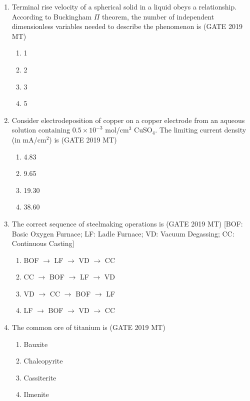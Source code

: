 \documentclass[12pt]{article}
\begin{document}
\begin{enumerate}
\item Terminal rise velocity of a spherical solid in a liquid obeys a relationship. According to Buckingham $\Pi$ theorem, the number of independent dimensionless variables needed to describe the phenomenon is \hspace{1em} (GATE 2019 MT)
\begin{enumerate}[label=(\alph*)]
    \item 1
    \item 2  
    \item 3   
    \item 5   
\end{enumerate}

\item Consider electrodeposition of copper on a copper electrode from an aqueous solution containing $0.5 \times 10^{-3}$ mol/cm$^3$ CuSO$_4$. The limiting current density (in mA/cm$^2$) is \hspace{1em} (GATE 2019 MT)
\begin{enumerate}[label=(\alph*)]
    \item 4.83
    \item 9.65  
    \item 19.30 
    \item 38.60
\end{enumerate}

\item The correct sequence of steelmaking operations is \hspace{1em} (GATE 2019 MT)  
[BOF: Basic Oxygen Furnace; LF: Ladle Furnace;  VD: Vacuum Degassing; CC: Continuous Casting]
\begin{enumerate}[label=(\alph*)]
    \item BOF $\to$ LF $\to$ VD $\to$ CC
    \item CC $\to$ BOF $\to$ LF $\to$ VD
    \item VD $\to$ CC $\to$ BOF $\to$ LF
    \item LF $\to$ BOF $\to$ VD $\to$ CC
\end{enumerate}

\item The common ore of titanium is \hspace{1em} (GATE 2019 MT)
\begin{enumerate}[label=(\alph*)]
    \item Bauxite
    \item Chalcopyrite
    \item Cassiterite
    \item Ilmenite
\end{enumerate}


\end{enumerate}
\end{document}
